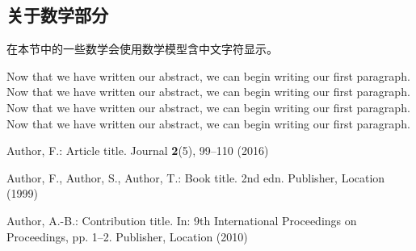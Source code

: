 \documentclass[a4paper, 11pt]{article}
\begin{document}
\begin{CJK*}{UTF8}{gbsn}
    \section{关于数学部分}
    在本节中的一些数学会使用数学模型含中文字符显示。
    
    \vspace{0.5cm} %
    
    Now that we have written our abstract, we can begin writing our first paragraph.
    Now that we have written our abstract, we can begin writing our first paragraph.
    Now that we have written our abstract, we can begin writing our first paragraph.
    Now that we have written our abstract, we can begin writing our first paragraph.
    
    \vspace{0.5cm}
    
    \newpage
    \begin{thebibliography}{8}
    Author, F.: Article title. Journal \textbf{2}(5), 99--110 (2016)
    
    
    Author, F., Author, S., Author, T.: Book title. 2nd edn. Publisher,
    Location (1999)
    
    Author, A.-B.: Contribution title. In: 9th International Proceedings
    on Proceedings, pp. 1--2. Publisher, Location (2010)
    
    \end{thebibliography}
    
    \end{CJK*}
    

    

    
\end{document}
